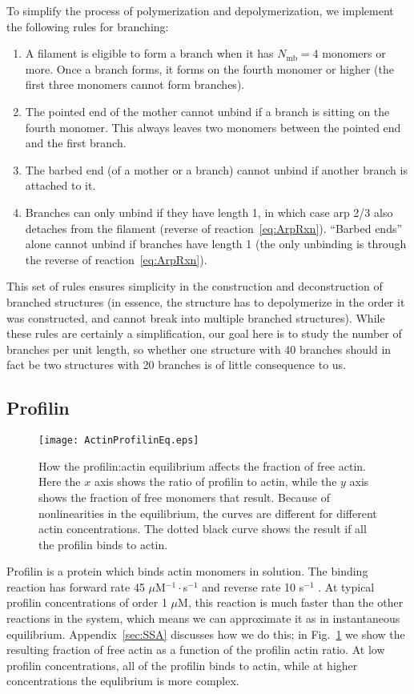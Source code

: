 \documentclass[11pt]{article}
\begin{document}
To simplify the process of polymerization and depolymerization, we implement the following rules for branching:
\begin{enumerate}
\item A filament is eligible to form a branch when it has $N_\text{mb}=4$ monomers or more. Once a branch forms, it forms on the fourth monomer or higher (the first three monomers cannot form branches). 
\item The pointed end of the mother cannot unbind if a branch is sitting on the fourth monomer. This always leaves two monomers between the pointed end and the first branch. 
\item The barbed end (of a mother or a branch) cannot unbind if another branch is attached to it. 
\item Branches can only unbind if they have length 1, in which case arp 2/3 also detaches from the filament (reverse of reaction\ \eqref{eq:ArpRxn}). ``Barbed ends'' alone cannot unbind if branches have length 1 (the only unbinding is through the reverse of reaction\ \eqref{eq:ArpRxn}).
\end{enumerate}
This set of rules ensures simplicity in the construction and deconstruction of branched structures (in essence, the structure has to depolymerize in the order it was constructed, and cannot break into multiple branched structures). While these rules are certainly a simplification, our goal here is to study the number of branches per unit length, so whether one structure with 40 branches should in fact be two structures with 20 branches is of little consequence to us. 


\subsection{Profilin}

\begin{figure}
\centering
\texttt{[image: ActinProfilinEq.eps]}
\caption{\label{fig:ProfilinEq}How the profilin:actin equilibrium affects the fraction of free actin. Here the $x$ axis shows the ratio of profilin to actin, while the $y$ axis shows the fraction of free monomers that result. Because of nonlinearities in the equilibrium, the curves are different for different actin concentrations. The dotted black curve shows the result if all the profilin binds to actin.}
\end{figure}


Profilin is a protein which binds actin monomers in solution. The binding reaction has forward rate 45 $\mu$M$^{-1}\cdot$s$^{-1}$ and reverse rate 10 s$^{-1}$ \cite{perelroizen1994interaction}. At typical profilin concentrations of order 1 $\mu$M, this reaction is much faster than the other reactions in the system, which means we can approximate it as in instantaneous equilibrium. Appendix\ \ref{sec:SSA} discusses how we do this; in Fig.\ \ref{fig:ProfilinEq} we show the resulting fraction of free actin as a function of the profilin actin ratio. At low profilin concentrations, all of the profilin binds to actin, while at higher concentrations the equlibrium is more complex.  
\end{document}
